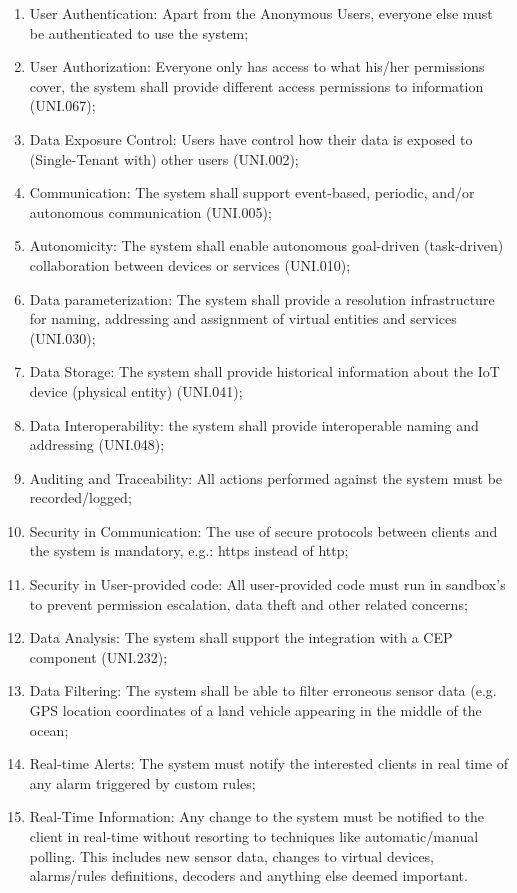 \begin{enumerate}
    \item User Authentication: Apart from the Anonymous Users, everyone else must be authenticated to use the system;
    \item User Authorization: Everyone only has access to what his/her permissions cover, the system shall provide different access permissions to information (UNI.067);
    \item Data Exposure Control: Users have control how their data is exposed to (Single-Tenant with) other users (UNI.002);
    \item Communication: The system shall support event-based, periodic, and/or autonomous communication (UNI.005);
    \item Autonomicity: The system shall enable autonomous goal-driven (task-driven) collaboration between devices or services (UNI.010);
    \item Data parameterization: The system shall provide a resolution infrastructure for naming, addressing and assignment of virtual entities and services (UNI.030);
    \item Data Storage: The system shall provide historical information about the \gls{IoT} device (physical entity) (UNI.041);
    \item Data Interoperability: the system  shall provide interoperable naming and addressing (UNI.048);
    \item Auditing and Traceability: All actions performed against the system must be recorded/logged;
    \item Security in Communication: The use of secure protocols between clients and the system is mandatory, e.g.: https instead of http;
    \item Security in User-provided code: All user-provided code must run in sandbox's to prevent permission escalation, data theft and other related concerns;
    \item Data Analysis: The system shall support the integration with a \gls{CEP} component (UNI.232);
    \item Data Filtering: The system shall be able to filter erroneous sensor data (e.g. GPS location coordinates of a land vehicle appearing in the middle of the ocean;
    \item Real-time Alerts: The system must notify the interested clients in real time of any alarm triggered by custom rules;
    \item Real-Time Information: Any change to the system must be notified to the client in real-time without resorting to techniques like automatic/manual polling. This includes new sensor data, changes to virtual devices, alarms/rules definitions, decoders and anything else deemed important.
\end{enumerate}

